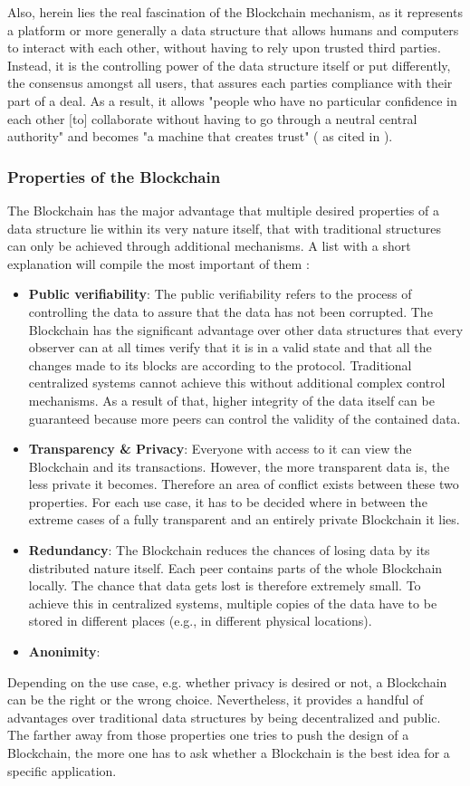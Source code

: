 Also, herein lies the real fascination of the Blockchain mechanism, as it represents a platform or more generally a data structure that allows humans and computers to interact with each other, without having to rely upon trusted third parties. Instead, it is the controlling power of the data structure itself or put differently, the consensus amongst all users, that assures each parties compliance with their part of a deal. As a result, it allows "people who have no particular confidence in each other [to] collaborate without having to go through a neutral central authority" and becomes "a machine that creates trust" (\cite{Economist2015} as cited in \cite{Shackelford2016}).
\subsubsection{Properties of the Blockchain}
The Blockchain has the major advantage that multiple desired properties of a data structure lie within its very nature itself, that with traditional structures can only be achieved through additional mechanisms. A list with a short explanation will compile the most important of them \cite{Wust2017}:
\begin{itemize}
    \item \textbf{Public verifiability}: The public verifiability refers to the process of controlling the data to assure that the data has not been corrupted. The Blockchain has the significant advantage over other data structures that every observer can at all times verify that it is in a valid state and that all the changes made to its blocks are according to the protocol. Traditional centralized systems cannot achieve this without additional complex control mechanisms.
      As a result of that, higher integrity of the data itself can be guaranteed because more peers can control the validity of the contained data.
    \item \textbf{Transparency \& Privacy}: Everyone with access to it can view the Blockchain and its transactions. However, the more transparent data is, the less private it becomes. Therefore an area of conflict exists between these two properties. For each use case, it has to be decided where in between the extreme cases of a fully transparent and an entirely private Blockchain it lies.

    \item \textbf{Redundancy}: The Blockchain reduces the chances of losing data by its distributed nature itself. Each peer contains parts of the whole Blockchain locally. The chance that data gets lost is therefore extremely small. To achieve this in centralized systems, multiple copies of the data have to be stored in different places (e.g., in different physical locations).
    \item \textbf{Anonimity}:
\end{itemize}
Depending on the use case, e.g. whether privacy is desired or not, a Blockchain can be the right or the wrong choice. Nevertheless, it provides a handful of advantages over traditional data structures by being decentralized and public. The farther away from those properties one tries to push the design of a Blockchain, the more one has to ask whether a Blockchain is the best idea for a specific application.

